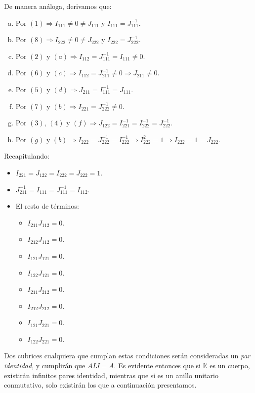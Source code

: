 \documentclass[a4paper, titlepage]{article}
\begin{document}
De manera análoga, derivamos que:

\begin{enumerate}[(a)]
	\item Por $(1) \Rightarrow I_{111} \neq 0 \neq J_{111}$ y $I_{111} = J_{111}^{-1}$.
	\item Por $(8) \Rightarrow I_{222} \neq 0 \neq J_{222}$ y $I_{222} = J_{222}^{-1}$.
	\item Por $(2)$ y $(a) \Rightarrow I_{112} = J_{111}^{-1} = I_{111} \neq 0$.
	\item Por $(6)$ y $(c) \Rightarrow I_{112} = J_{211}^{-1} \neq 0 \Rightarrow J_{211} \neq 0$.
	\item Por $(5)$ y $(d) \Rightarrow J_{211} = I_{111}^{-1} = J_{111}$.
	\item Por $(7)$ y $(b) \Rightarrow I_{221} = J_{222}^{-1} \neq 0$.
	\item Por $(3)$, $(4)$ y $(f) \Rightarrow J_{122} = I_{221}^{-1} = I_{222}^{-1} = J_{222}^{-1}$.
	\item Por $(g)$ y $(b) \Rightarrow I_{222} = J_{222}^{-1} = I_{222}^{-1} \Rightarrow I_{222}^2 = 1 \Rightarrow I_{222} = 1 = J_{222}$.
\end{enumerate}

Recapitulando:

\begin{itemize}
	\item $I_{221} = J_{122} = I_{222} = J_{222} = 1$.
	\item $J_{211}^{-1} = I_{111} = J_{111}^{-1} = I_{112}$.
	\item El resto de términos:

	\begin{itemize}
		\item $I_{211} J_{112} = 0$.
		\item $I_{212} J_{112} = 0$.
		\item $I_{121} J_{121} = 0$.
		\item $I_{122} J_{121} = 0$.
		\item $I_{211} J_{212} = 0$.
		\item $I_{212} J_{212} = 0$.
		\item $I_{121} J_{221} = 0$.
		\item $I_{122} J_{221} = 0$.
	\end{itemize}
\end{itemize}

Dos cubrices cualquiera que cumplan estas condiciones serán consideradas un \textit{par identidad}, y cumplirán que $AIJ = A$. Es evidente entonces que si $\mathbb{K}$ es un cuerpo, existirán infinitos pares identidad, mientras que si es un anillo unitario conmutativo, solo existirán los que a continuación presentamos.
\end{document}
